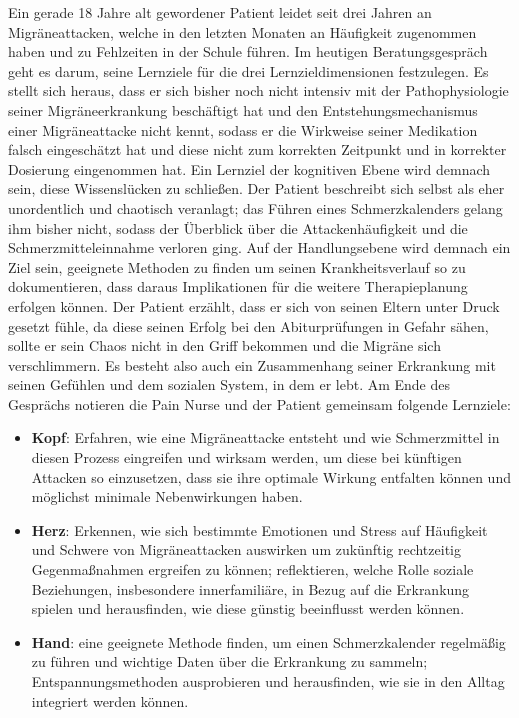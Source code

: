 \documentclass[
  twoside,
  parskip=half-,
]{scrreprt}
\begin{document}
\begin{beispiel}
  Ein gerade 18 Jahre alt gewordener Patient leidet seit  drei Jahren an Migräneattacken, welche in den letzten Monaten an Häufigkeit zugenommen haben und zu Fehlzeiten in der Schule führen. Im heutigen Beratungsgespräch geht es darum, seine Lernziele für die drei Lernzieldimensionen festzulegen. Es stellt sich heraus, dass er sich bisher noch nicht intensiv mit der Pathophysiologie seiner Migräneerkrankung beschäftigt hat und den Entstehungsmechanismus einer Migräneattacke nicht kennt, sodass er die Wirkweise seiner Medikation falsch eingeschätzt hat und diese nicht zum korrekten Zeitpunkt und in korrekter Dosierung eingenommen hat. Ein Lernziel der kognitiven Ebene wird demnach sein, diese Wissenslücken zu schließen. Der Patient beschreibt sich selbst als eher unordentlich und chaotisch veranlagt; das Führen eines Schmerzkalenders gelang ihm bisher nicht, sodass der Überblick über die Attackenhäufigkeit und die Schmerzmitteleinnahme verloren ging. Auf der Handlungsebene wird demnach ein Ziel sein, geeignete Methoden zu finden um seinen Krankheitsverlauf so zu dokumentieren, dass daraus Implikationen für die weitere Therapieplanung erfolgen können. Der Patient erzählt, dass er sich von seinen Eltern unter Druck gesetzt fühle, da diese seinen Erfolg bei den Abiturprüfungen in Gefahr sähen, sollte er sein Chaos nicht in den Griff bekommen und die Migräne sich verschlimmern. Es besteht also auch ein Zusammenhang seiner Erkrankung mit seinen Gefühlen und dem sozialen System, in dem er lebt. Am Ende des Gesprächs notieren die Pain Nurse und der Patient gemeinsam folgende Lernziele:
\begin{itemize}
  \item \textbf{Kopf}: Erfahren, wie eine Migräneattacke entsteht und wie Schmerzmittel in diesen Prozess eingreifen und wirksam werden, um diese bei künftigen Attacken so einzusetzen, dass sie ihre optimale Wirkung entfalten können und möglichst minimale Nebenwirkungen haben.
  \item \textbf{Herz}: Erkennen, wie sich bestimmte Emotionen und Stress auf Häufigkeit und Schwere von Migräneattacken auswirken um zukünftig rechtzeitig Gegenmaßnahmen ergreifen zu können; reflektieren, welche Rolle soziale Beziehungen, insbesondere innerfamiliäre, in Bezug auf die Erkrankung spielen und herausfinden, wie diese günstig beeinflusst werden können.
  \item \textbf{Hand}: eine geeignete Methode finden, um einen Schmerzkalender regelmäßig zu führen und wichtige Daten über die Erkrankung zu sammeln; Entspannungsmethoden ausprobieren und herausfinden, wie sie in den Alltag integriert werden können.
\end{itemize} 

\end{beispiel}
\end{document}
